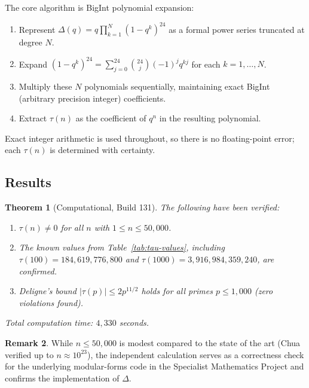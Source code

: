 \documentclass[12pt,a4paper]{amsart}
\newtheorem{theorem}{Theorem}[section]
\theoremstyle{definition}
\newtheorem{remark}[theorem]{Remark}
\begin{document}
The core algorithm is BigInt polynomial expansion:
\begin{enumerate}[label=\arabic*., leftmargin=2em]
  \item Represent $\Delta(q) = q \prod_{k=1}^{N}(1-q^k)^{24}$ as a formal power
        series truncated at degree $N$.
  \item Expand $(1-q^k)^{24} = \sum_{j=0}^{24}\binom{24}{j}(-1)^j q^{kj}$
        for each $k = 1, \ldots, N$.
  \item Multiply these $N$ polynomials sequentially, maintaining exact BigInt
        (arbitrary precision integer) coefficients.
  \item Extract $\tau(n)$ as the coefficient of $q^n$ in the resulting polynomial.
\end{enumerate}

Exact integer arithmetic is used throughout, so there is no floating-point error;
each $\tau(n)$ is determined with certainty.

\subsection{Results}

\begin{theorem}[Computational, Build 131]\label{thm:computational}
  The following have been verified:
  \begin{enumerate}[label=(\roman*)]
    \item $\tau(n) \neq 0$ for all $n$ with $1 \leq n \leq 50{,}000$.
    \item The known values from Table~\ref{tab:tau-values}, including
          $\tau(100) = 184{,}619{,}776{,}800$ and
          $\tau(1000) = 3{,}916{,}984{,}359{,}240$, are confirmed.
    \item Deligne's bound $|\tau(p)| \leq 2p^{11/2}$ holds for all primes
          $p \leq 1{,}000$ (zero violations found).
  \end{enumerate}
  Total computation time: $4{,}330$ seconds.
\end{theorem}

\begin{remark}
  While $n \leq 50{,}000$ is modest compared to the state of the art (Chua
  \cite{Chua2004} verified up to $n \approx 10^{23}$), the independent calculation
  serves as a correctness check for the underlying modular-forms code in the
  Specialist Mathematics Project and confirms the implementation of $\Delta$.
\end{remark}
\end{document}
